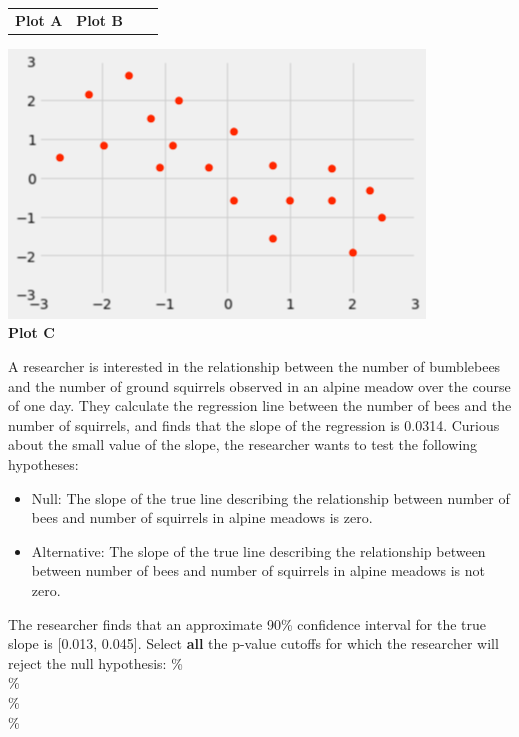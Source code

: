 \begin{enumerate}
{\begin{tabular}{l@{\hskip 1in}l@{\hskip 0.1in}l@{\hskip 0.1in}l}
    {\hskip 1in}\textbf{Plot A}
    &{\hskip 1in}\textbf{Plot B}
    \end{tabular}
    \begin{center}
        \includegraphics[scale=.45]{figures/corrneg05soln.png}\\
        \textbf{Plot C}
    \end{center}
    }
    \vskip 0.4in

     A researcher is interested in the relationship between the number of bumblebees and the number of ground squirrels observed in an alpine meadow over the course of one day. They calculate the regression line between the number of bees and the number of squirrels, and finds that the slope of the regression is 0.0314. Curious about the small value of the slope, the researcher wants to test the following hypotheses: 
    \begin{itemize}
        \item Null: The slope of the true line describing the relationship between number of bees and  number of squirrels in alpine meadows is zero. 
        \item Alternative: The slope of the true line describing the relationship between between number of bees and  number of squirrels in alpine meadows is not zero.
    \end{itemize}
The researcher finds that an  approximate 90\% confidence interval for the true slope is [0.013, 0.045]. Select \textbf{all} the p-value cutoffs for which the researcher will reject the null hypothesis:
\vskip 0.1in
\%\\
\%\\
\%\\
\%\\

\end{enumerate}